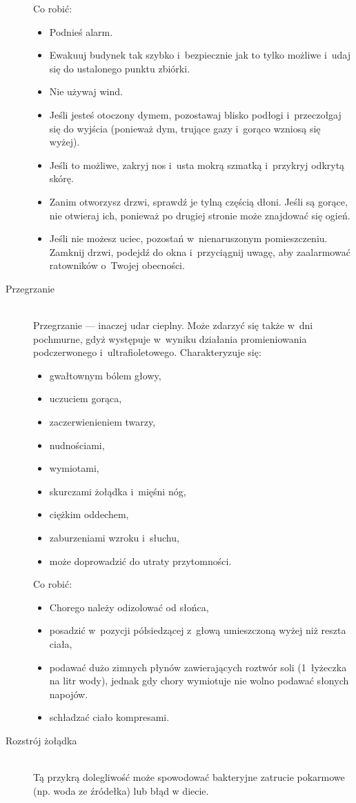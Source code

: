 \documentclass[a5paper,10pt,titlepage,twoside]{article}
\begin{document}
\begin{description}
Co robić:
\begin{itemize}
\item Podnieś alarm.
\item Ewakuuj budynek tak szybko i~bezpiecznie jak to tylko możliwe i~udaj się do ustalonego punktu zbiórki.
\item Nie używaj wind.
\item Jeśli jesteś otoczony dymem, pozostawaj blisko podłogi i~przeczołgaj się do wyjścia (ponieważ dym, trujące gazy i~gorąco wzniosą się wyżej).
\item Jeśli to możliwe, zakryj nos i~usta mokrą szmatką i~przykryj odkrytą skórę.
\item Zanim otworzysz drzwi, sprawdź je tylną częścią dłoni. Jeśli są gorące, nie otwieraj ich, ponieważ po drugiej stronie może znajdować się ogień.
\item Jeśli nie możesz uciec, pozostań w~nienaruszonym pomieszczeniu. Zamknij drzwi, podejdź do okna i~przyciągnij uwagę, aby zaalarmować ratowników o~Twojej obecności.
\end{itemize}
\item[Przegrzanie] \hfill \\ Przegrzanie --- inaczej udar cieplny. Może zdarzyć się także w~dni pochmurne, gdyż występuje w~wyniku działania promieniowania podczerwonego i~ultrafioletowego. Charakteryzuje się:
\begin{itemize}
\item gwałtownym bólem głowy,
\item uczuciem gorąca,
\item zaczerwienieniem twarzy,
\item nudnościami,
\item wymiotami,
\item skurczami żołądka i~mięśni nóg,
\item ciężkim oddechem,
\item zaburzeniami wzroku i~słuchu,
\item może doprowadzić do utraty przytomności.
\end{itemize}
Co robić:
\begin{itemize}
\item Chorego należy odizolować od słońca,
\item posadzić w~pozycji półsiedzącej z~głową umieszczoną wyżej niż reszta ciała,
\item podawać dużo zimnych płynów zawierających roztwór soli (1~łyżeczka na litr wody), jednak gdy chory wymiotuje nie wolno podawać słonych napojów.
\item schładzać ciało kompresami.
\end{itemize}
\item[Rozstrój żołądka] \hfill \\ Tą przykrą dolegliwość może spowodować bakteryjne zatrucie pokarmowe (np. woda ze źródełka) lub błąd w diecie.


\end{description}
\end{document}
